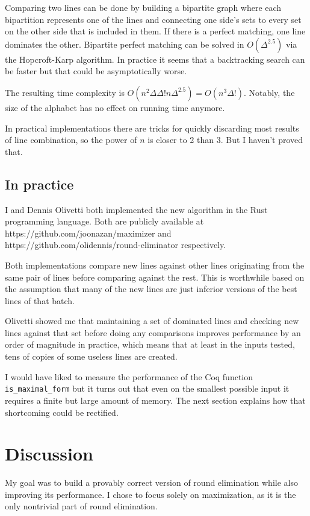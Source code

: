 \documentclass[english, 12pt, a4paper, sci, a-1b, online]{aaltothesis}
\newcommand\icoq[1]{\texttt{#1}}
\begin{document}
Comparing two lines can be done by building a bipartite graph where each bipartition represents one of the lines and connecting one side's sets to every set on the other side that is included in them. If there is a perfect matching, one line dominates the other. Bipartite perfect matching can be solved in $O(\Delta^{2.5})$ via the Hopcroft-Karp algorithm. In practice it seems that a backtracking search can be faster but that could be asymptotically worse.

The resulting time complexity is $O(n^2\Delta\Delta!n\Delta^{2.5}) = O(n^3\Delta!)$. Notably, the size of the alphabet has no effect on running time anymore.

In practical implementations there are tricks for quickly discarding most results of line combination, so the power of $n$ is closer to 2 than 3. But I haven't proved that.

\subsection{In practice}

I and Dennis Olivetti both implemented the new algorithm in the Rust programming language. Both are publicly available at https://github.com/joonazan/maximizer and https://github.com/olidennis/round-eliminator respectively.

Both implementations compare new lines against other lines originating from the same pair of lines before comparing against the rest. This is worthwhile based on the assumption that many of the new lines are just inferior versions of the best lines of that batch.

Olivetti showed me that maintaining a set of dominated lines and checking new lines against that set before doing any comparisons improves performance by an order of magnitude in practice, which means that at least in the inputs tested, tens of copies of some useless lines are created.

I would have liked to measure the performance of the Coq function \icoq{is_maximal_form} but it turns out that even on the smallest possible input it requires a finite but large amount of memory. The next section explains how that shortcoming could be rectified.


\section{Discussion}

My goal was to build a provably correct version of round elimination while also improving its performance. I chose to focus solely on maximization, as it is the only nontrivial part of round elimination.
\end{document}
